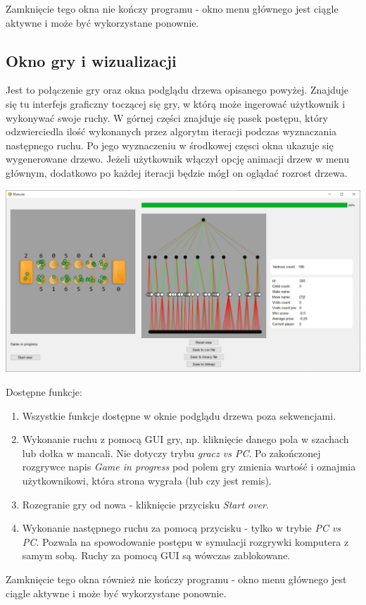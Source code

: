 \documentclass{article}
\begin{document}
Zamknięcie tego okna nie kończy programu - okno menu głównego jest ciągle aktywne i może być wykorzystane ponownie.

\subsection{Okno gry i wizualizacji}
Jest to połączenie gry oraz okna podglądu drzewa opisanego powyżej. Znajduje się tu interfejs graficzny toczącej się gry, w którą może ingerować użytkownik i wykonywać swoje ruchy. W górnej części znajduje się pasek postępu, który odzwierciedla ilość wykonanych przez algorytm iteracji podczas wyznaczania następnego ruchu. Po jego wyznaczeniu w środkowej częsci okna ukazuje się wygenerowane drzewo. Jeżeli użytkownik włączył opcję animacji drzew w menu głównym, dodatkowo po każdej iteracji będzie mógł on oglądać rozrost drzewa.\\
\begin{center}
	\includegraphics[width=\textwidth]{game-window}
\end{center}
Dostępne funkcje:\\
\begin{enumerate}
	\item Wszystkie funkcje dostępne w oknie podglądu drzewa poza sekwencjami.\\
	\item Wykonanie ruchu z pomocą GUI gry, np. kliknięcie danego pola w szachach lub dołka w mancali. Nie dotyczy trybu \textit{gracz vs PC}. Po zakończonej rozgrywce napis \textit{Game in progress} pod polem gry zmienia wartość i oznajmia użytkownikowi, która strona wygrała (lub czy jest remis).\\
	\item Rozegranie gry od nowa - kliknięcie przycisku \textit{Start over}.\\
	\item Wykonanie następnego ruchu za pomocą przycisku - tylko w trybie \textit{PC vs PC}. Pozwala na spowodowanie postępu w symulacji rozgrywki komputera z samym sobą. Ruchy za pomocą GUI są wówczas zablokowane.\\
\end{enumerate}
Zamknięcie tego okna również nie kończy programu - okno menu głównego jest ciągle aktywne i może być wykorzystane ponownie.
\end{document}
